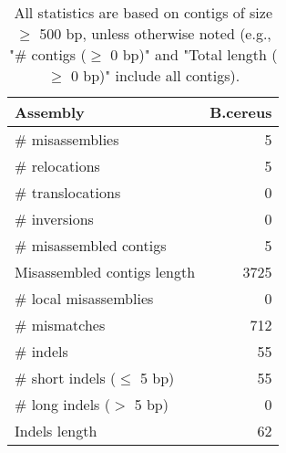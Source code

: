 \documentclass[12pt,a4paper]{article}
\begin{document}
\begin{table}[ht]
\begin{center}
\caption{All statistics are based on contigs of size $\geq$ 500 bp, unless otherwise noted (e.g., "\# contigs ($\geq$ 0 bp)" and "Total length ($\geq$ 0 bp)" include all contigs).}
\begin{tabular}{|l*{1}{|r}|}
\hline
Assembly & B.cereus \\ \hline
\# misassemblies & 5 \\ \hline
\hspace{5mm}\# relocations & 5 \\ \hline
\hspace{5mm}\# translocations & 0 \\ \hline
\hspace{5mm}\# inversions & 0 \\ \hline
\# misassembled contigs & 5 \\ \hline
Misassembled contigs length & 3725 \\ \hline
\# local misassemblies & 0 \\ \hline
\# mismatches & 712 \\ \hline
\# indels & 55 \\ \hline
\hspace{5mm}\# short indels ($\leq$ 5 bp) & 55 \\ \hline
\hspace{5mm}\# long indels ($>$ 5 bp) & 0 \\ \hline
Indels length & 62 \\ \hline
\end{tabular}
\end{center}
\end{table}
\end{document}
